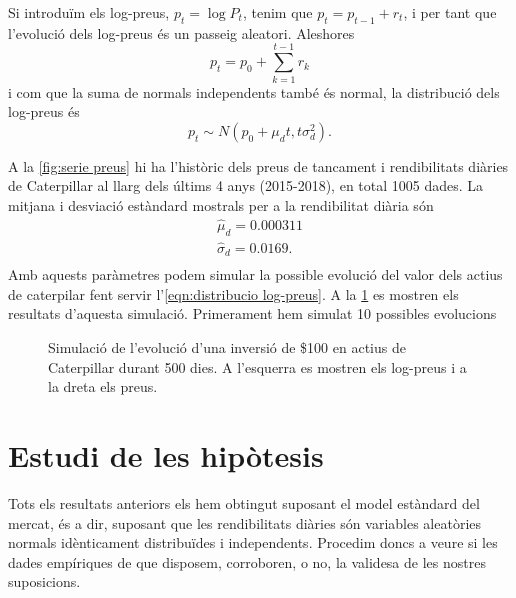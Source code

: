 \documentclass{article}
\numberwithin{table}{section}
\numberwithin{figure}{section}
\numberwithin{equation}{section}
\begin{document}
Si introduïm els log-preus, \( p_t = \log{P_t} \), tenim que \( p_t = p_{t-1} + r_t \), i per tant que l'evolució dels log-preus és un passeig aleatori. Aleshores
\begin{equation} \label{eqn:passeig aleatori}
	p_t = p_0 + \sum_{k = 1}^{t-1}r_k 
\end{equation}
i com que la suma de normals independents també és normal, la distribució dels log-preus és
\begin{equation} \label{eqn:distribucio log-preus}
	p_t \sim N(p_0 + \mu_d t, t\sigma_d^2).
\end{equation}

A la \cref{fig:serie preus} hi ha l'històric dels preus de tancament i rendibilitats diàries de Caterpillar al llarg dels últims 4 anys (2015-2018), en total 1005 dades. La mitjana i desviació estàndard mostrals per a la rendibilitat diària són
\begin{equation} \label{eq:parametres}
	\begin{gathered}
		\hat{\mu}_d = 0.000311 \\
		\hat{\sigma}_d	= 0.0169. \\
	\end{gathered}
\end{equation}
Amb aquests paràmetres podem simular la possible evolució del valor dels actius de caterpilar fent servir l'\cref{eqn:distribucio log-preus}. A la \cref{fig:simulacio} es mostren els resultats d'aquesta simulació. Primerament hem simulat 10 possibles evolucions



\begin{figure}[htb]
	\centering \sffamily \small
	
	\caption{Simulació de l'evolució d'una inversió de \$100 en actius de Caterpillar durant 500 dies. A l'esquerra es mostren els log-preus i a la dreta els preus.}
	\label{fig:simulacio}
\end{figure}



\section{Estudi de les hipòtesis}
Tots els resultats anteriors els hem obtingut suposant el model estàndard del mercat, és a dir, suposant que les rendibilitats diàries són variables aleatòries normals idènticament distribuïdes i independents. Procedim doncs a veure si les dades empíriques de que disposem, corroboren, o no, la validesa de les nostres suposicions.
\end{document}
